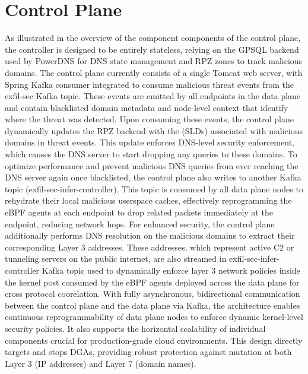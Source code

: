 \documentclass [11pt, proquest] {uwthesis}[2020/02/24]
\begin{document}
\section{Control Plane}
As illustrated in the overview of the component components of the control plane, the controller is designed to be entirely stateless, relying on the GPSQL backend used by PowerDNS for DNS state management and RPZ zones to track malicious domains. The control plane currently consists of a single Tomcat web server, with Spring Kafka consumer integrated to consume malicious threat events from the exfil-sec Kafka topic. These events are emitted by all endpoints in the data plane and contain blacklisted domain metadata and node-level context that identify where the threat was detected. Upon consuming these events, the control plane dynamically updates the RPZ backend with the (SLDs) associated with malicious domains in threat events. This update enforces DNS-level security enforcement, which causes the DNS server to start dropping any queries to these domains. To optimize performance and prevent malicious DNS queries from ever reaching the DNS server again once blacklisted, the control plane also writes to another Kafka topic (exfil-sec-infer-controller). This topic is consumed by all data plane nodes to rehydrate their local malicious userspace caches, effectively reprogramming the eBPF agents at each endpoint to drop related packets immediately at the endpoint, reducing network hops. For enhanced security, the control plane additionally performs DNS resolution on the malicious domains to extract their corresponding Layer 3 addresses. These addresses, which  represent active C2 or tunneling servers on the public internet, are also streamed in exfil-sec-infer-controller Kafka topic used to dynamically enforce layer 3 network policies inside the kernel post consumed by the eBPF agents deployed across the data plane for cross protocol coorelation. With fully asynchronous, bidirectional communication between the control plane and the data plane via Kafka, the architecture enables continuous reprogrammability of data plane nodes to enforce dynamic kernel-level security policies. It also supports the horizontal scalability of individual components crucial for production-grade cloud environments. This design directly targets and stops DGAs, providing robust protection against mutation at both Layer 3 (IP addresses) and Layer 7 (domain names).
\end{document}
